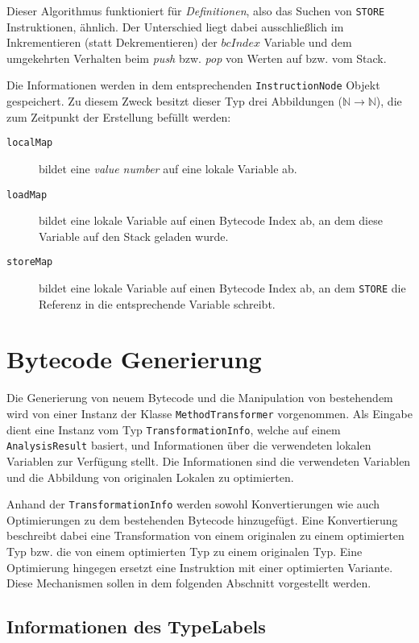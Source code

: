 Dieser Algorithmus funktioniert für \textit{Definitionen}, also das Suchen von \texttt{STORE}
Instruktionen, ähnlich. Der Unterschied liegt dabei ausschließlich im Inkrementieren 
(statt Dekrementieren) der $bcIndex$ Variable und dem umgekehrten Verhalten beim 
\textit{push} bzw. \textit{pop} von Werten auf bzw. vom Stack.

Die Informationen werden in dem entsprechenden \texttt{InstructionNode} Objekt
gespeichert. Zu diesem Zweck besitzt dieser Typ drei Abbildungen ($\mathbb{N} \rightarrow 
\mathbb{N}$), die zum Zeitpunkt der Erstellung befüllt werden:

\begin{description}
	\item [\texttt{localMap}] bildet eine \textit{value number} auf eine lokale Variable ab.
	\item [\texttt{loadMap}] bildet eine lokale Variable auf einen Bytecode Index ab, an 
	dem diese Variable auf den Stack geladen wurde.
	\item [\texttt{storeMap}] bildet eine lokale Variable auf einen Bytecode Index ab, an
	dem \texttt{STORE} die Referenz in die entsprechende Variable schreibt.
\end{description} 

\section{Bytecode Generierung}

Die Generierung von neuem Bytecode und die Manipulation von bestehendem wird von einer Instanz der
Klasse \texttt{MethodTransformer} vorgenommen. Als Eingabe dient eine Instanz vom Typ 
\texttt{TransformationInfo}, welche auf einem \texttt{AnalysisResult} basiert, und 
Informationen über die verwendeten lokalen Variablen zur Verfügung stellt. Die Informationen
sind die verwendeten Variablen und die Abbildung von originalen Lokalen zu optimierten.

Anhand der \texttt{TransformationInfo} werden sowohl Konvertierungen wie auch Optimierungen zu dem bestehenden
Bytecode hinzugefügt. Eine Konvertierung beschreibt dabei eine Transformation von einem originalen 
zu einem optimierten Typ bzw. die von einem optimierten Typ zu einem originalen Typ. Eine Optimierung 
hingegen ersetzt eine Instruktion mit einer optimierten Variante. Diese Mechanismen sollen in dem 
folgenden Abschnitt vorgestellt werden.

\subsection{Informationen des TypeLabels}
\label{ssec:infoLabel}

